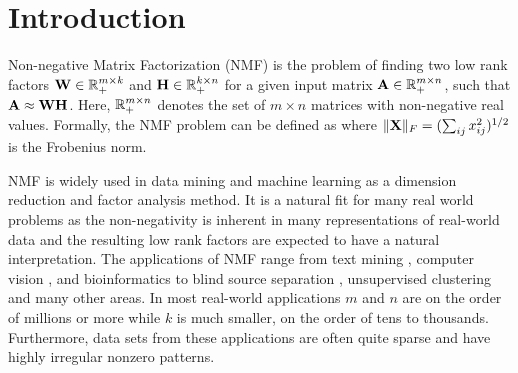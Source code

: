 

\section{Introduction}


Non-negative Matrix Factorization (NMF) is the problem of finding two low rank factors $\mathbf{W}\in \mathbb{R}_+^{m\times k}$ and $\mathbf{H}\in \mathbb{R}_+^{k \times n}$ for a given input matrix  $\mathbf{A}\in \mathbb{R}_+^{m\times n}$, such that $\mathbf{A} \approx \mathbf{W} \mathbf{H}$.
Here, $\mathbb{R}_+^{m\times n}$ denotes the set of $m \times n$ matrices with non-negative real values.
Formally, the NMF problem can be defined as 
where $\|{\mathbf{X}}\|_F=(\sum_{ij} x_{ij}^2)^{1/2}$ is the Frobenius norm. 

NMF is widely used in data mining and machine learning as a dimension reduction and factor analysis method.
It is a natural fit for many real world problems as the non-negativity is inherent in many representations of real-world data and
the resulting low rank factors are expected to have a natural interpretation. The applications of NMF range from text mining \cite{pauca2004text},  computer vision \cite{hoyer2004non}, and bioinformatics \cite{kim2007sparse} to blind source separation  \cite{cichocki2009nonnegative}, unsupervised clustering \cite{kuang2012symmetric,kuang2013symnmf}  and many other areas.
In most real-world applications $m$ and $n$ are on the order of millions or more while $k$ is much smaller, on the order of tens to thousands.
Furthermore, data sets from these applications are often quite sparse and have highly irregular nonzero patterns.

